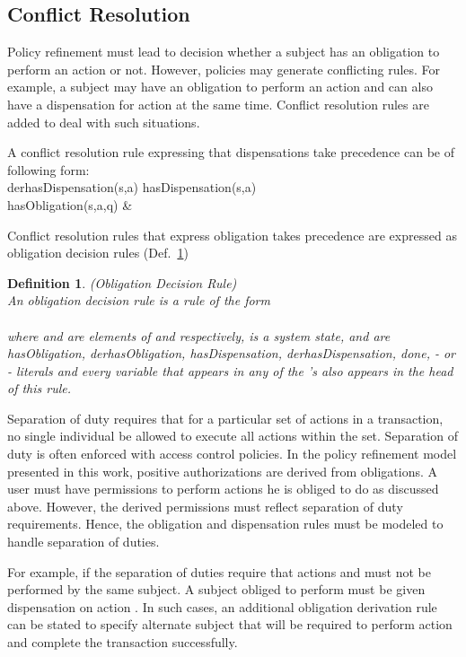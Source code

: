 \documentclass[12pt,journal,letterpaper,onecolumn]{IEEEtran}
\newtheorem{definition}{Definition}[section]
\begin{document}
\subsection{Conflict Resolution}

Policy refinement must lead to decision whether a subject has an
obligation to perform an action or not. However, policies may
generate conflicting rules. For example, a subject may have an
obligation to perform an action  and can also have a dispensation
for action  at the same time. Conflict resolution rules are added
to deal with such situations.

A conflict resolution rule expressing that dispensations take
precedence can be of following form: \\
{\ttfamily derhasDispensation(s,a) 
  hasDispensation(s,a) \\
  \indent\indent\indent\indent\indent\indent\indent\indent\indent
  \indent\indent\indent\indent\indent\indent\indent\indent\indent
   hasObligation(s,a,q)  \& }

Conflict resolution rules that express obligation takes precedence
are expressed as obligation decision rules
(Def.~\ref{def:obligationdecisionrule})

\begin{definition}(Obligation Decision Rule)\\
An obligation decision rule is a rule of the form \\
 \\
where  and  are elements of  and  respectively,  is
a system state, and  are {\ttfamily
hasObligation, derhasObligation, hasDispensation, derhasDispensation,
done}, - or - literals and every variable
that appears in any of the 's also appears in the head of this
rule. \label{def:obligationdecisionrule}
\end{definition}

Separation of duty requires that for a particular set of actions in
a transaction, no single individual be allowed to execute all
actions within the set. Separation of duty is often enforced with
access control policies.  In the policy refinement model presented
in this work, positive authorizations are derived from obligations.
A user must have permissions to perform actions he is obliged to do
as discussed above. However, the derived permissions must reflect
separation of duty requirements. Hence, the obligation and
dispensation rules must be modeled to handle separation of duties.

For example, if the separation of duties require that actions 
and  must not be performed by the same subject. A subject
obliged to perform  must be given dispensation on action .
In such cases, an additional obligation derivation rule can be
stated to specify alternate subject that will be required to
perform action  and complete the transaction successfully.
\end{document}
